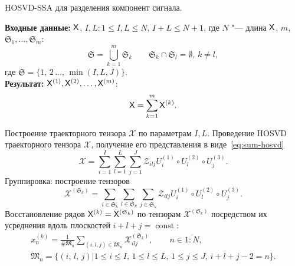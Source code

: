 \documentclass[specialist,
    substylefile = spbu_report.rtx,
    subf,href,colorlinks=true, 12pt]{disser}
\theoremstyle{plain}
\theoremstyle{definition}
\theoremstyle{remark}
\newcommand{\Input}{\textbf{Входные данные: }}
\newcommand{\Output}{\textbf{Результат: }}
\begin{document}
   \begin{algorithm}[!h]
        \caption{HOSVD-SSA для разделения компонент сигнала.}
        \label{alg:hosvd-ssa-components}
        \Input $\mathsf{X}$, $I,L: 1\leqslant I,L \leqslant N,\, I + L \leqslant N + 1$, где $N$ "--- длина $\mathsf{X}$, $m$,
        $\mathfrak{S}_1, \ldots, \mathfrak{S}_m:$
        \[
            \mathfrak{S}=\bigcup_{k=1}^{m}\mathfrak{S}_k \qquad \mathfrak{S}_k\cap \mathfrak{S}_l =\emptyset,\, k\ne l,
        \] где $\mathfrak{S}=\{1,\, 2\,\ldots,\, \min(I, L, J)\}$.\\
        \Output $\mathsf{X}^{(1)}, \mathsf{X}^{(2)}, \ldots, \mathsf{X}^{(m)}$:
        \[
            \mathsf{X}=\sum_{k=1}^{m}\mathsf{X}^{(k)}.
        \]
        \begin{algorithmic}[1]
            \State \label{alg:first-step}
            Построение траекторного тензора $\mathcal{X}$ по параметрам $I, L$.
            \State \label{alg:second-step}
            Проведение HOSVD траекторного тензора $\mathcal{X}$, получение его представления в виде~\eqref{eq:sum-hosvd}
            \begin{equation}
                \mathcal{X}=\sum_{i=1}^{I} \sum_{l=1}^{L} \sum_{j=1}^{J} \mathcal{Z}_{ilj} U^{(1)}_{i}
                \circ U^{(2)}_{l} \circ U^{(3)}_{j}.
                \label{eq:trajectory-hosvd}
            \end{equation}
            \State Группировка: построение тензоров
            \begin{equation*}
                \mathcal{X}^{(\mathfrak{S}_k)}=\sum_{i \in \mathfrak{S}_k} \sum_{l\in \mathfrak{S}_k} \sum_{j\in \mathfrak{S}_k}
                \mathcal{Z}_{ilj} U^{(1)}_{i}\circ U^{(2)}_{l} \circ U^{(3)}_{j}.
            \end{equation*}
            \State Восстановление рядов $\mathsf{X}^{(k)}=\mathsf{X}^{(\mathfrak{S}_k)}$ по тензорам $\mathcal{X}^{(\mathfrak{S}_k)}$ посредством их усреднения вдоль
            плоскостей $i+l+j=\operatorname{const}$:
            \begin{gather*}
                x^{(k)}_n=\frac{1}{\#\mathfrak{M}_n}\sum_{(i,l,j)\in \mathfrak{M}_n} \mathcal{X}^{(\mathfrak{S}_k)}_{ilj},\qquad n\in \overline{1:N},\\
                \mathfrak{M}_n=\{(i,\, l,\, j) | 1\leqslant i \leqslant I,\, 1\leqslant l \leqslant L,\, 1\leqslant j \leqslant J,\, i+l+j-2=n\}.
            \end{gather*}
        \end{algorithmic}
    \end{algorithm}
\end{document}
